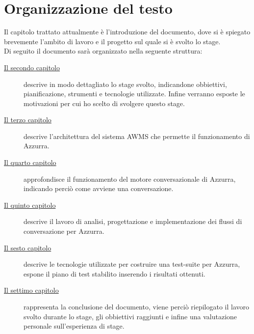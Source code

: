 \section{Organizzazione del testo}
Il capitolo trattato attualmente è l'introduzione del documento, dove si è spiegato brevemente l'ambito di lavoro e il progetto sul quale si è svolto lo stage.\\
Di seguito il documento sarà organizzato nella seguente struttura:
\begin{description}
    
    \item[{\hyperref[cap:descrizione-stage]{Il secondo capitolo}}] descrive in modo dettagliato lo stage svolto, indicandone obbiettivi, pianificazione, strumenti e tecnologie utilizzate. Infine verranno esposte le motivazioni per cui ho scelto di svolgere questo stage.
    
    \item[{\hyperref[cap:archittettura del sistema AWMS]{Il terzo capitolo}}] descrive l'architettura del sistema AWMS che permette il funzionamento di Azzurra.
    
    \item[{\hyperref[cap:flow engine]{Il quarto capitolo}}] approfondisce il funzionamento del motore conversazionale di Azzurra, indicando perciò come avviene una conversazione.
    
    \item[{\hyperref[cap:flussi di conversazione]{Il quinto capitolo}}] descrive il lavoro di analisi, progettazione e implementazione dei flussi di conversazione per Azzurra.
    
    \item[{\hyperref[cap:test]{Il sesto capitolo}}] descrive le tecnologie utilizzate per costruire una test-suite per Azzurra, espone il piano di test stabilito inserendo i risultati ottenuti.
    
    \item[{\hyperref[cap:conclusioni]{Il settimo capitolo}}] rappresenta la conclusione del documento, viene perciò riepilogato il lavoro svolto durante lo stage, gli obbiettivi raggiunti e infine una valutazione personale sull'esperienza di stage.
\end{description}

